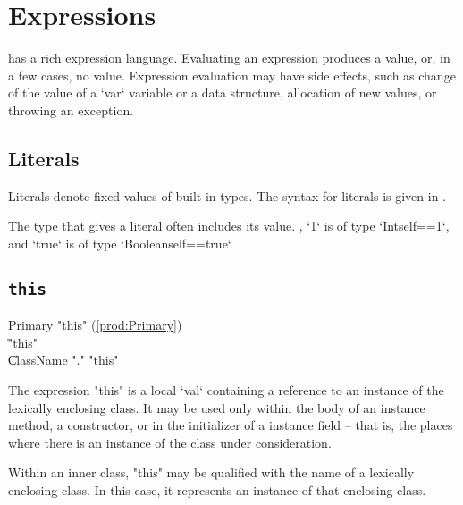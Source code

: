 \chapter{Expressions}\label{XtenExpressions}

\Xten{} has a rich expression language.
Evaluating an expression produces a value, or, in a few cases, no value. 
Expression evaluation may have side effects, such as change of the value of a 
\xcd`var` variable or a data structure, allocation of new values, or throwing
an exception. 



\section{Literals}

Literals denote fixed values of built-in types. 
The syntax for literals is given in . 

The type that \Xten{} gives a literal often includes its value. \Eg, \xcd`1`
is of type \xcd`Int{self==1}`, and \xcd`true` is of type
\xcd`Boolean{self==true}`.

\section{{\tt this}}

\begin{bbgrammar}
             Primary \: \xcd"this" (\ref{prod:Primary}) \\
                    \| \xcd"this" \\
                    \| ClassName \xcd"." \xcd"this" \\
\end{bbgrammar}


The expression \xcd"this" is a  local \xcd`val` containing a reference
to an instance of the lexically enclosing class.
It may be used only within the body of an instance method, a
constructor, or in the initializer of a instance field -- that is, the places
where there is an instance of the class under consideration.

Within an inner class, \xcd"this" may be qualified with the
name of a lexically enclosing class.  In this case, it
represents an instance of that enclosing class.  


